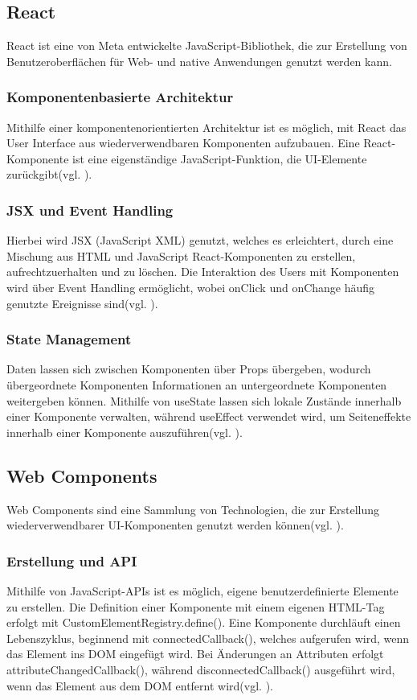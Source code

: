\documentclass[oneside]{ausarbeitung}
\begin{document}
\subsection{React}
React ist eine von Meta entwickelte JavaScript-Bibliothek, die zur Erstellung von Benutzeroberflächen für Web- und native Anwendungen genutzt werden kann.

\subsubsection{Komponentenbasierte Architektur}
Mithilfe einer komponentenorientierten Architektur ist es möglich, mit React das User Interface aus wiederverwendbaren Komponenten aufzubauen. Eine React-Komponente ist eine eigenständige JavaScript-Funktion, die UI-Elemente zurückgibt(vgl. \parencite{react}).

\subsubsection{JSX und Event Handling}
Hierbei wird JSX (JavaScript XML) genutzt, welches es erleichtert, durch eine Mischung aus HTML und JavaScript React-Komponenten zu erstellen, aufrechtzuerhalten und zu löschen. Die Interaktion des Users mit Komponenten wird über Event Handling ermöglicht, wobei onClick und onChange häufig genutzte Ereignisse sind(vgl. \parencite{react}).

\subsubsection{State Management}
Daten lassen sich zwischen Komponenten über Props übergeben, wodurch übergeordnete Komponenten Informationen an untergeordnete Komponenten weitergeben können. Mithilfe von useState lassen sich lokale Zustände innerhalb einer Komponente verwalten, während useEffect verwendet wird, um Seiteneffekte innerhalb einer Komponente auszuführen(vgl. \parencite{react}).

\subsection{Web Components}
Web Components sind eine Sammlung von Technologien, die zur Erstellung wiederverwendbarer UI-Komponenten genutzt werden können(vgl. \parencite{webcomponents}). 

\subsubsection{Erstellung und API}
Mithilfe von JavaScript-APIs ist es möglich, eigene benutzerdefinierte Elemente zu erstellen. Die Definition einer Komponente mit einem eigenen HTML-Tag erfolgt mit CustomElementRegistry.define(). Eine Komponente durchläuft einen Lebenszyklus, beginnend mit connectedCallback(), welches aufgerufen wird, wenn das Element ins DOM eingefügt wird. Bei Änderungen an Attributen erfolgt attributeChangedCallback(), während disconnectedCallback() ausgeführt wird, wenn das Element aus dem DOM entfernt wird(vgl. \parencite{webcomponents}).
\end{document}
